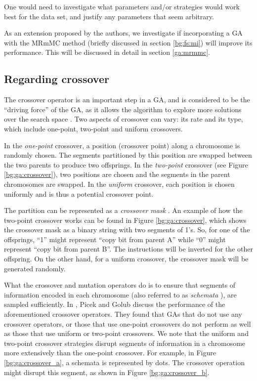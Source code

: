 \documentclass[12pt, twoside, a4paper]{report}
\begin{document}

One would need to investigate what parameters and/or strategies would work best for the data set, and justify any parameters that seem arbitrary.

As an extension proposed by the authors, we investigate if incorporating a GA with the MRmMC method (briefly discussed in section \ref{bg:fs:mi})  will improve its performance. This will be discussed in detail in section \ref{ga:mrmmc}.

\subsection{Regarding crossover} \label{bg:ga:crossover_sect}
The crossover operator is an important step in a GA, and is considered to be the ``driving force'' of the GA, as it allows the algorithm to explore more solutions over the search space \cite{RefWorks:223, RefWorks:226}. Two aspects of crossover can vary: its rate and its type, which include one-point, two-point and uniform crossovers.

In the \textit{one-point} crossover, a position (crossover point) along a chromosome is randomly chosen. The segments partitioned by this position are swapped between the two parents to produce two offsprings. In the \textit{two-point} crossover (see Figure \ref{bg:ga:crossover}), two positions are chosen and the segments in the parent chromosomes are swapped. In the \textit{uniform} crossover, each position is chosen uniformly and is thus a potential crossover point.

The partition can be represented as a \textit{crossover mask} \cite{RefWorks:205}. An example of how the two-point crossover works can be found in Figure \ref{bg:ga:crossover}, which shows the crossover mask as a binary string with two segments of 1's. So, for one of the offsprings, ``1'' might represent ``copy bit from parent A'' while ``0'' might represent ``copy bit from parent B''. The instructions will be inverted for the other offspring. On the other hand, for a uniform crossover, the crossover mask will be generated randomly.

What the crossover and mutation operators do is to ensure that segments of information encoded in each chromosome (also referred to as \textit{schemata} \cite{RefWorks:224}), are sampled sufficiently. In \cite{RefWorks:224}, Picek and Golub discuss the performance of the aforementioned crossover operators. They found that GAs that do not use any crossover operators, or those that use one-point crossovers do not perform as well as those that use uniform or two-point crossovers. We note that the uniform and two-point crossover strategies disrupt segments of information in a chromosome more extensively than the one-point crossover. For example, in Figure \ref{bg:ga:crossover_a}, a schemata is represented by dots. The crossover operation might disrupt this segment, as shown in Figure \ref{bg:ga:crossover_b}.
\end{document}
